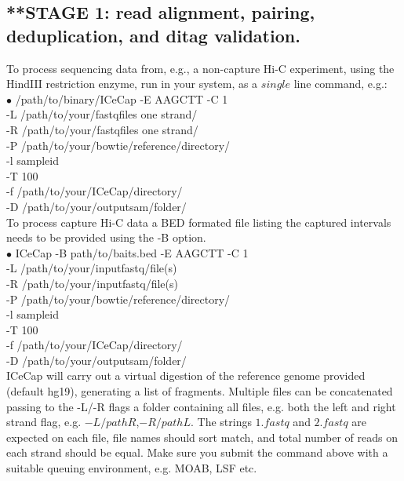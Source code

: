 \documentclass[10pt,a4paper]{article}
\begin{document}
\subsection{**STAGE 1: read alignment, pairing, deduplication, and ditag validation.}

\vspace*{1cm}
To process sequencing data from, e.g., a non-capture Hi-C experiment, using the HindIII restriction enzyme, run in your system, as a $single$ line command, e.g.:\\

$\bullet$ /path/to/binary/ICeCap -E AAGCTT -C 1 \\
-L /path/to/your/fastqfiles one strand/ \\
-R /path/to/your/fastqfiles one strand/ \\
-P /path/to/your/bowtie/reference/directory/ \\
-l sampleid \\
-T 100 \\
-f /path/to/your/ICeCap/directory/ \\
-D /path/to/your/outputsam/folder/ \\

To process capture Hi-C data a BED formated file listing the captured intervals needs to be provided using the -B option. \\

$\bullet$ ICeCap -B path/to/baits.bed -E AAGCTT -C 1  \\
-L /path/to/your/inputfastq/file(s)  \\
-R /path/to/your/inputfastq/file(s)  \\
-P /path/to/your/bowtie/reference/directory/ \\
-l sampleid \\
-T 100 \\
-f /path/to/your/ICeCap/directory/ \\
-D /path/to/your/outputsam/folder/ \\

ICeCap will carry out a virtual digestion of the reference genome provided (default hg19), generating a list of fragments.
Multiple files can be concatenated passing to the -L/-R flags a folder containing all files, e.g. both the left and right strand flag, e.g. $-L /pathR$,$-R /pathL$. The strings $1.fastq$ and $2.fastq$ are expected on each file, file names should sort match, and total number of reads on each strand should be equal.
Make sure you submit the command above with a suitable queuing environment, e.g. MOAB, LSF etc.
\end{document}
